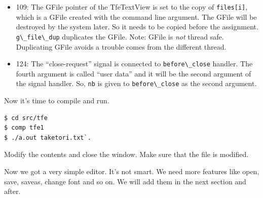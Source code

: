 \begin{itemize}
\tightlist
\item
  109: The GFile pointer of the TfeTextView is set to the copy of
  \passthrough{\lstinline!files[i]!}, which is a GFile created with the
  command line argument. The GFile will be destroyed by the system
  later. So it needs to be copied before the assignment.
  \passthrough{\lstinline!g\_file\_dup!} duplicates the GFile. Note:
  GFile is \emph{not} thread safe. Duplicating GFile avoids a trouble
  comes from the different thread.
\item
  124: The ``close-request'' signal is connected to
  \passthrough{\lstinline!before\_close!} handler. The fourth argument
  is called ``user data'' and it will be the second argument of the
  signal handler. So, \passthrough{\lstinline!nb!} is given to
  \passthrough{\lstinline!before\_close!} as the second argument.
\end{itemize}

Now it's time to compile and run.

\begin{lstlisting}
$ cd src/tfe
$ comp tfe1
$ ./a.out taketori.txt`.
\end{lstlisting}

Modify the contents and close the window. Make sure that the file is
modified.

Now we got a very simple editor. It's not smart. We need more features
like open, save, saveas, change font and so on. We will add them in the
next section and after.
